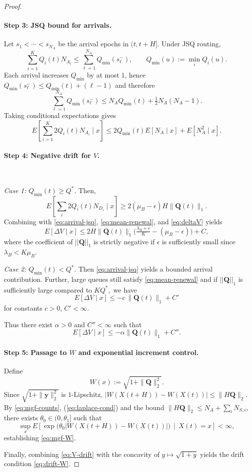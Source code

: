 \documentclass[11pt]{article}
\newcommand{\E}{E}
\begin{document}
\begin{proof}
\paragraph{Step 3: JSQ bound for arrivals.}
Let $s_1<\cdots<s_{N_A}$ be the arrival epochs in $(t,t+H]$.
Under JSQ routing,
\[
\sum_{i=1}^K Q_i(t)N_{A_i}
\le \sum_{\ell=1}^{N_A} Q_{\min}(s_\ell^-),
\qquad
Q_{\min}(u):=\min_i Q_i(u).
\]
Each arrival increases $Q_{\min}$ by at most $1$, hence
$Q_{\min}(s_\ell^-)\le Q_{\min}(t)+(\ell-1)$ and therefore
\[
\sum_{\ell=1}^{N_A} Q_{\min}(s_\ell^-)
\le N_A Q_{\min}(t)+\tfrac12 N_A(N_A-1).
\]
Taking conditional expectations gives
\begin{equation}
\label{eq:arrival-jsq}
\E\!\left[\sum_{i=1}^K 2Q_i(t)N_{A_i} \mid x\right]
\le
2Q_{\min}(t)\E[N_A\mid x]+\E[N_A^2\mid x].
\end{equation}

\paragraph{Step 4: Negative drift for $V$.} $\ $

\emph{Case 1: $Q_{\min}(t)\ge Q^*$.}
Then,
\[
\E\!\left[\sum_i 2Q_i(t)N_{D_i}\mid x\right]
\ge 2(\mu_B-\epsilon)H \|\mathbf Q(t)\|_1.
\]
Combining with \eqref{eq:arrival-jsq}, \eqref{eq:mean-renewal}, and \eqref{eq:deltaV} yields
\[
\E[\Delta V\mid x]
\le
2H\|\mathbf Q(t)\|_1
\Big(\tfrac{\lambda_B+\epsilon}{K}-(\mu_B-\epsilon)\Big)+C,
\]
where the coefficient of $||\mathbf{Q}||_1$ is strictly negative if $\epsilon$ is sufficiently small since $\lambda_B<K\mu_B$.

\emph{Case 2: $Q_{\min}(t)<Q^*$.}
Then \eqref{eq:arrival-jsq} yields a bounded arrival contribution. Further, large queues still satisfy \eqref{eq:mean-renewal} and if $||\mathbf{Q}||_1$ is sufficiently large compared to $KQ^*,$ we have
\[
\E[\Delta V\mid x]\le -c\,\|\mathbf Q(t)\|_1+C'
\]
for constants $c>0$, $C'<\infty$.

Thus there exist $\alpha>0$ and $C''<\infty$ such that
\begin{equation}
\label{eq:V-drift}
\E[\Delta V\mid x]\le -\alpha\|\mathbf Q(t)\|_1+C'' .
\end{equation}

\paragraph{Step 5: Passage to $W$ and exponential increment control.}
Define
\[
W(x):=\sqrt{1+\|\mathbf Q\|_2^2}.
\]
Since $\sqrt{1+\|\mathbf y\|_2^2}$ is $1$-Lipschitz,
$
|W(X(t+H))-W(X(t))|
\le \|H\mathbf Q\|_2 .
$
By \eqref{eq:mgf-counts}, (\ref{eq:laplace-cond}) and the bound
$\|H\mathbf Q\|_2\le N_A+\sum_i N_{S,i}$,
there exists $\theta_0\in(0,\theta_1]$ such that \cite{asmussen2007applied}
\[
\sup_x
\E\!\left[
\exp\!\big(\theta_0|W(X(t+H))-W(X(t))|\big)
\,\middle|\,
X(t)=x
\right]
<\infty,
\]
establishing \eqref{eq:mgf-W}.

Finally, combining \eqref{eq:V-drift} with the concavity of $y\mapsto\sqrt{1+y}$
yields the drift condition \eqref{eq:drift-W}.
\end{proof}
\end{document}
